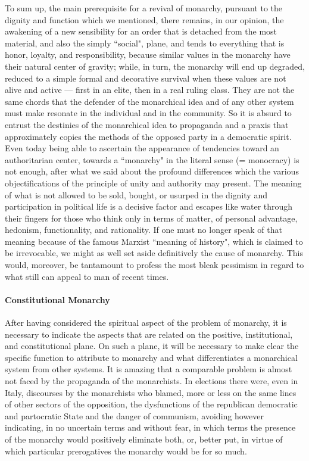 To sum up, the main prerequisite for a revival of monarchy, pursuant to the dignity and function which we mentioned, there remains, in our opinion, the awakening of a new sensibility for an order that is detached from the most material, and also the simply ``social", plane, and tends to everything that is honor, loyalty, and responsibility, because similar values in the monarchy have their natural center of gravity; while, in turn, the monarchy will end up degraded, reduced to a simple formal and decorative survival when these values are not alive and active — first in an elite, then in a real ruling class. They are not the same chords that the defender of the monarchical idea and of any other system must make resonate in the individual and in the community. So it is absurd to entrust the destinies of the monarchical idea to propaganda and a praxis that approximately copies the methods of the opposed party in a democratic spirit. Even today being able to ascertain the appearance of tendencies toward an authoritarian center, towards a ``monarchy" in the literal sense (= monocracy) is not enough, after what we said about the profound differences which the various objectifications of the principle of unity and authority may present. The meaning of what is not allowed to be sold, bought, or usurped in the dignity and participation in political life is a decisive factor and escapes like water through their fingers for those who think only in terms of matter, of personal advantage, hedonism, functionality, and rationality. If one must no longer speak of that meaning because of the famous Marxist ``meaning of history", which is claimed to be irrevocable, we might as well set aside definitively the cause of monarchy. This would, moreover, be tantamount to profess the most bleak pessimism in regard to what still can appeal to man of recent times.

\paragraph{Constitutional Monarchy}
After having considered the spiritual aspect of the problem of monarchy, it is necessary to indicate the aspects that are related on the positive, institutional, and constitutional plane. On such a plane, it will be necessary to make clear the specific function to attribute to monarchy and what differentiates a monarchical system from other systems. It is amazing that a comparable problem is almost not faced by the propaganda of the monarchists. In elections there were, even in Italy, discourses by the monarchists who blamed, more or less on the same lines of other sectors of the opposition, the dysfunctions of the republican democratic and partocratic State and the danger of communism, avoiding however indicating, in no uncertain terms and without fear, in which terms the presence of the monarchy would positively eliminate both, or, better put, in virtue of which particular prerogatives the monarchy would be for so much.

